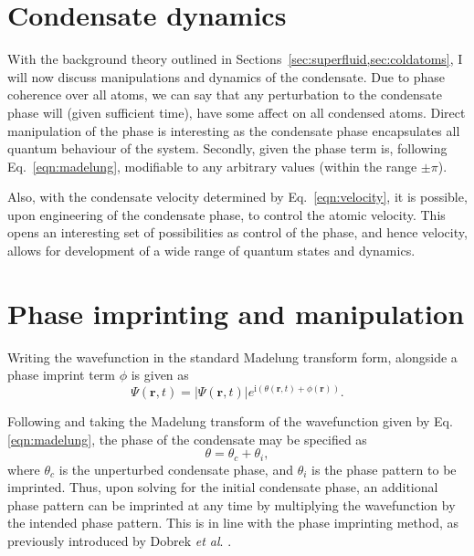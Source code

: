 \section{Condensate dynamics}
With the background theory outlined in Sections~\ref{sec:superfluid,sec:coldatoms}, I will now discuss manipulations and dynamics of the condensate. Due to phase coherence over all atoms, we can say that any perturbation to the condensate phase will (given sufficient time), have some affect on all condensed atoms. Direct manipulation of the phase is interesting as the condensate phase encapsulates all quantum behaviour of the system. Secondly, given the phase term is, following Eq.~\ref{eqn:madelung}, modifiable to any arbitrary values (within the range $\pm \pi$).

Also, with the condensate velocity determined by Eq.~\ref{eqn:velocity}, it is possible, upon engineering of the condensate phase, to control the atomic velocity. This opens an interesting set of possibilities as control of the phase, and hence velocity, allows for development of a wide range of quantum states and dynamics.




\section{Phase imprinting and manipulation}
Writing the wavefunction in the standard Madelung transform form, alongside a phase imprint term $\phi$ is given as
\begin{equation}
    \Psi(\mathbf{r},t) = |\Psi(\mathbf{r},t)|e^{\text{i}(\theta(\mathbf{r},t) + \phi(\mathbf{r}))}.
\end{equation}


Following \cite{BK:Pitaevskii_Stringari_2003} and taking the Madelung transform of the wavefunction given by Eq. \eqref{eqn:madelung}, the phase of the condensate may be specified as
\begin{equation}
\theta = \theta_c + \theta_i,
\end{equation}
where $\theta_c$ is the unperturbed condensate phase, and $\theta_i$ is the phase pattern to be imprinted. Thus, upon solving for the initial condensate phase, an additional phase pattern can be imprinted at any time by multiplying the wavefunction by the intended phase pattern. This is in line with the phase imprinting method, as previously introduced by Dobrek \textit{et al}. \cite{Vtx:Dobrek_pra_1999}. 



